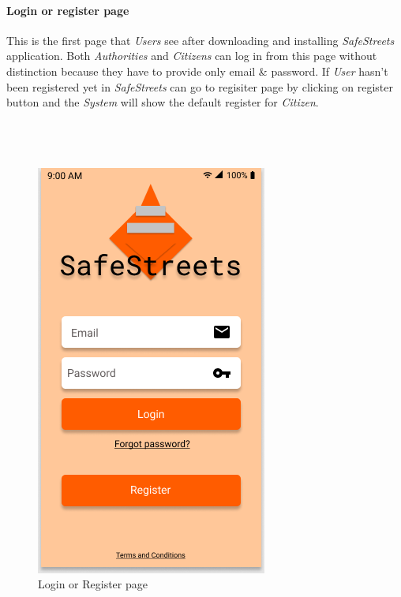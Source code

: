 \documentclass{article}
\begin{document}
\paragraph{Login or register page}
This is the first page that \textit{Users} see after downloading and installing \textit{SafeStreets} 
application. Both \textit{Authorities} and \textit{Citizens} can log in from this page without 
distinction because they have to provide only email \& password. If \textit{User} hasn't been registered
yet in \textit{SafeStreets} can go to regisiter page by clicking on register button and the \textit{System} will
show the default register for \textit{Citizen}.
\\
\\
\\
\\
\begin{figure}[H]
    \centering
    \includegraphics[scale=0.5]{img/mockups/login.png}
    \caption{Login or Register page}
\end{figure}

\clearpage
\end{document}
